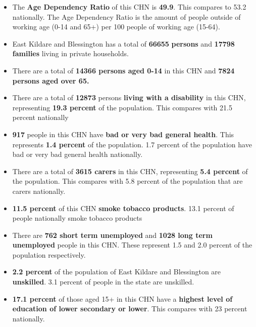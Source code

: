 \documentclass{article}
\begin{document}
\begin{itemize}

\item The \textbf{Age Dependency Ratio} of this CHN is  \textbf{49.9}. This compares to 53.2 nationally. The Age Dependency Ratio is the amount of people outside of working age (0-14 and 65+) per 100 people of working age (15-64). 

\item East Kildare and Blessington has a total of \textbf{\num{66655}} \textbf{persons} and  \textbf{\num{17798}} \textbf{families} living in private households.

\item There are a total of \textbf{\num{14366} persons aged 0-14} in this CHN and \textbf{\num{7824} persons aged over 65.} 

\item There are a total of \textbf{\num{12873}} persons \textbf{living with a disability} in this CHN, representing \textbf{19.3 percent} of the population. This compares with  21.5 percent nationally

\item \textbf{\num{917}} people in this CHN have \textbf{bad or very bad general health}. This represents \textbf{1.4 percent} of the population. 1.7 percent of the population have bad or very bad general health nationally. 

\item There are a total of \textbf{\num{3615} carers} in this CHN, representing \textbf{5.4 percent} of the population. This compares with 5.8 percent of the population that are carers nationally. 

\item \textbf{11.5 percent} of this CHN \textbf{smoke tobacco products}. 13.1 percent of people nationally smoke tobacco products

\item There are \textbf{\num{762} short term unemployed} and \textbf{\num{1028} long term unemployed} people in this CHN. These represent 1.5 and 2.0 percent of the population respectively.

\item  \textbf{2.2 percent} of the population of East Kildare and Blessington are \textbf{unskilled}. 3.1 percent of people in the state are unskilled.

\item \textbf{17.1 percent} of those aged 15+ in this CHN have a \textbf{highest level of education of lower secondary or lower}. This compares with 23 percent nationally. 


\end{itemize}
\end{document}
